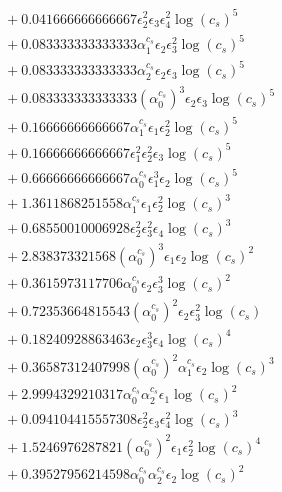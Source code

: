 \documentclass[10pt]{article}
\begin{document}
\begin{align*}
&{}  + 0.041666666666667 \epsilon_{2}^{2} \epsilon_{3} \epsilon_{4}^{2} \log{\left(c_{s} \right)}^{5} \\
&{}  + 0.083333333333333 \alpha_{1}^{c_s} \epsilon_{2} \epsilon_{3}^{2} \log{\left(c_{s} \right)}^{5} \\
&{}  + 0.083333333333333 \alpha_{2}^{c_s} \epsilon_{2} \epsilon_{3} \log{\left(c_{s} \right)}^{5} \\
&{}  + 0.083333333333333 \left(\alpha_{0}^{c_s}\right)^{3} \epsilon_{2} \epsilon_{3} \log{\left(c_{s} \right)}^{5} \\
&{}  + 0.16666666666667 \alpha_{1}^{c_s} \epsilon_{1} \epsilon_{2}^{2} \log{\left(c_{s} \right)}^{5} \\
&{}  + 0.16666666666667 \epsilon_{1}^{2} \epsilon_{2}^{2} \epsilon_{3} \log{\left(c_{s} \right)}^{5} \\
&{}  + 0.66666666666667 \alpha_{0}^{c_s} \epsilon_{1}^{3} \epsilon_{2} \log{\left(c_{s} \right)}^{5} \\
&{}  + 1.3611868251558 \alpha_{1}^{c_s} \epsilon_{1} \epsilon_{2}^{2} \log{\left(c_{s} \right)}^{3} \\
&{}  + 0.68550010006928 \epsilon_{2}^{2} \epsilon_{3}^{2} \epsilon_{4} \log{\left(c_{s} \right)}^{3} \\
&{}  + 2.838373321568 \left(\alpha_{0}^{c_s}\right)^{3} \epsilon_{1} \epsilon_{2} \log{\left(c_{s} \right)}^{2} \\
&{}  + 0.3615973117706 \alpha_{0}^{c_s} \epsilon_{2} \epsilon_{3}^{3} \log{\left(c_{s} \right)}^{2} \\
&{}  + 0.72353664815543 \left(\alpha_{0}^{c_s}\right)^{2} \epsilon_{2} \epsilon_{3}^{2} \log{\left(c_{s} \right)} \\
&{}  + 0.18240928863463 \epsilon_{2} \epsilon_{3}^{3} \epsilon_{4} \log{\left(c_{s} \right)}^{4} \\
&{}  + 0.36587312407998 \left(\alpha_{0}^{c_s}\right)^{2} \alpha_{1}^{c_s} \epsilon_{2} \log{\left(c_{s} \right)}^{3} \\
&{}  + 2.9994329210317 \alpha_{0}^{c_s} \alpha_{2}^{c_s} \epsilon_{1} \log{\left(c_{s} \right)}^{2} \\
&{}  + 0.094104415557308 \epsilon_{2}^{2} \epsilon_{3} \epsilon_{4}^{2} \log{\left(c_{s} \right)}^{3} \\
&{}  + 1.5246976287821 \left(\alpha_{0}^{c_s}\right)^{2} \epsilon_{1} \epsilon_{2}^{2} \log{\left(c_{s} \right)}^{4} \\
&{}  + 0.39527956214598 \alpha_{0}^{c_s} \alpha_{2}^{c_s} \epsilon_{2} \log{\left(c_{s} \right)}^{2} \\

\end{align*}
\end{document}
